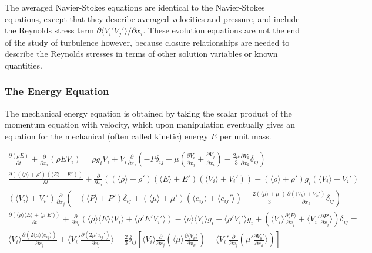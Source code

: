 \documentclass[10pt]{article}
\newcommand{\beqa}{\begin{equation}\begin{aligned}}
\newcommand{\eeqa}{\end{aligned}\end{equation}}
\newcommand{\la}{\langle}
\newcommand{\ra}{\rangle}
\begin{document}
\begin{flushleft}
The averaged Navier-Stokes equations are identical to the Navier-Stokes equations, except that they describe averaged velocities and pressure, and include the Reynolds stress term \(\partial\la V_i'V_j'\ra/\partial x_i\). These evolution equations are not the end of the study of turbulence however, because closure relationships are needed to describe the Reynolds stresses in terms of other solution variables or known quantities. 




\subsubsection{The Energy Equation}

The mechanical energy equation is obtained by taking the scalar product of the momentum equation with velocity, which upon manipulation eventually gives an equation for the mechanical (often called kinetic) energy \(E\) per unit mass.

\beqa
\frac{\partial(\rho E)}{\partial t}+\frac{\partial}{\partial x_i}\left(\rho EV_i\right)=\rho g_iV_i+V_i\frac{\partial}{\partial x_j}\left(-P\delta_{ij}+\mu\left(\frac{\partial V_i}{\partial x_j}+\frac{\partial V_j}{\partial x_i}\right)-\frac{2\mu}{3}\frac{\partial V_k}{\partial x_k}\delta_{ij}\right)\\
\frac{\partial((\la\rho\ra+\rho') (\la E\ra+E'))}{\partial t}+\frac{\partial}{\partial x_i}\left((\la\rho\ra+\rho') (\la E\ra+E')(\la V_i\ra+V_i')\right)-(\la\rho\ra+\rho') g_i(\la V_i\ra+V_i')=\quad\quad\\
(\la V_i\ra+V_i')\frac{\partial}{\partial x_j}\left(-(\la P\ra+P')\delta_{ij}+(\la\mu\ra+\mu')\left(\la e_{ij}\ra+\la e_{ij}'\ra\right)-\frac{2(\la\mu\ra+\mu')}{3}\frac{\partial (\la V_k\ra+V_k')}{\partial x_k}\delta_{ij}\right)\\
\frac{\partial(\la\rho\ra\la E\ra+\la\rho'E'\ra)}{\partial t}+\frac{\partial}{\partial x_i}\left(\la\rho\ra\la E\ra\la V_i\ra+\la\rho'E'V_i'\ra\right)-\la\rho\ra\la V_i\ra g_i+\la\rho'V_i'\ra g_i+\left(\la V_i\ra\frac{\partial \la P\ra}{\partial x_j}+\la V_i'\frac{\partial P'}{\partial x_j}\ra\right)\delta_{ij}=\quad\quad\\
\la V_i\ra\frac{\partial(2\la\mu\ra\la e_{ij}\ra)}{\partial x_j}+\la V_i'\frac{\partial(2\mu'e_{ij}')}{\partial x_j}\ra-\frac{2}{3}\delta_{ij}\left\lbrack\la V_i\ra\frac{\partial}{\partial x_j}\left(\la\mu\ra\frac{\partial\la V_k\ra}{\partial x_k}\right)-\la V_i'\frac{\partial}{\partial x_j}\left(\mu'\frac{\partial V_k'}{\partial x_k}\ra\right)\right\rbrack\\
\eeqa


\end{flushleft}
\end{document}
